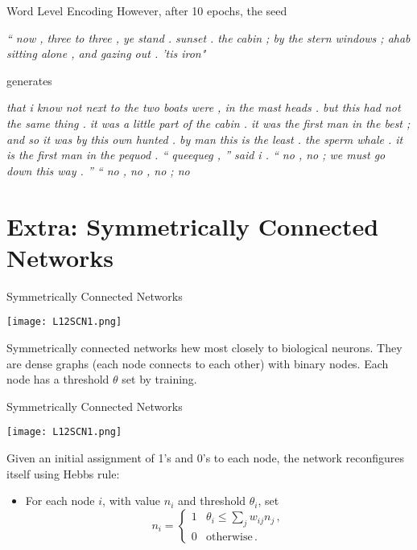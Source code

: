 \documentclass[10pt, table, dvipsnames,xcdraw, handout]{beamer}
\begin{document}
\begin{frame}[fragile]{Word Level Encoding}
However, after 10 epochs, the seed

\emph{“ now , three to three , ye stand . sunset . the cabin ; by the stern windows ; ahab sitting alone , and gazing out . ’tis iron"}

generates

\emph{that i know not next to the two boats were , in the mast heads . but this had not the same thing . it was a little part of the cabin . it was the first man in the best ; and so it was by this own hunted . by man this is the least . the sperm whale . it is the first man in the pequod . “ queequeg , ” said i . “ no , no ; we must go down this way . ” “ no , no , no ; no }
\end{frame}












\section{Extra: Symmetrically Connected Networks}



\begin{frame}[fragile]{Symmetrically Connected Networks}
  \begin{minipage}[t][0.5\textheight][t]{\textwidth}
	\centering \texttt{[image: L12SCN1.png]} 
  \end{minipage}
  \vfill
\begin{minipage}[t][0.5\textheight][t]{\textwidth}
Symmetrically connected networks hew most closely to biological neurons. They are dense graphs (each node connects to each other) with binary nodes. Each node has a threshold $\theta$ set by training.
\end{minipage}
\end{frame}



\begin{frame}[fragile]{Symmetrically Connected Networks}
  \begin{minipage}[t][0.5\textheight][t]{\textwidth}
	\centering \texttt{[image: L12SCN1.png]} 
  \end{minipage}
  \vfill
\begin{minipage}[t][0.5\textheight][t]{\textwidth}
Given an initial assignment of 1's and 0's to each node, the network reconfigures itself using Hebbs rule:\pause

\begin{itemize}
\item[] For each node $i$, with value $n_i$ and threshold $\theta_i$, set
$$
n_i = \begin{cases}
1 & \theta_i\leq  \sum_j w_{ij}n_j \,,
\\
0 & \text{otherwise}\,.
\end{cases}
$$
\end{itemize}
\end{minipage}
\end{frame}
\end{document}
